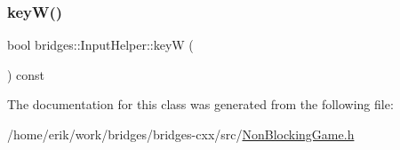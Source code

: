 \mbox{\label{classbridges_1_1_input_helper_add1c8bdaf86452d68f51ef9d795b3372}} 
\subsubsection{\texorpdfstring{key\+W()}{keyW()}}
{\footnotesize\ttfamily bool bridges\+::\+Input\+Helper\+::keyW (\begin{DoxyParamCaption}{ }\end{DoxyParamCaption}) const\hspace{0.3cm}{\ttfamily [inline]}}



The documentation for this class was generated from the following file\+:\begin{DoxyCompactItemize}
\item 
/home/erik/work/bridges/bridges-\/cxx/src/\hyperlink{_non_blocking_game_8h}{Non\+Blocking\+Game.\+h}\end{DoxyCompactItemize}
